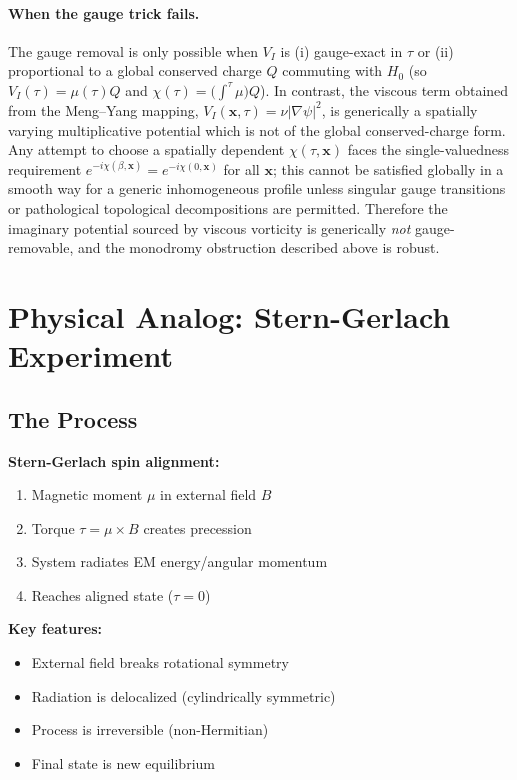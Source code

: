 \documentclass[11pt]{article}
\begin{document}
\paragraph{When the gauge trick fails.}
The gauge removal is only possible when \(V_I\) is (i) gauge-exact in \(\tau\) or (ii) proportional to a global conserved charge \(Q\) commuting with \(H_0\) (so \(V_I(\tau)=\mu(\tau)Q\) and \(\chi(\tau)=\big(\int^\tau \mu\big)Q\)). In contrast, the viscous term obtained from the Meng--Yang mapping, \(V_I(\mathbf x,\tau)=\nu|\nabla\psi|^2\), is generically a spatially varying multiplicative potential which is not of the global conserved-charge form. Any attempt to choose a spatially dependent \(\chi(\tau,\mathbf x)\) faces the single-valuedness requirement \(e^{-i\chi(\beta,\mathbf x)}=e^{-i\chi(0,\mathbf x)}\) for all \(\mathbf x\); this cannot be satisfied globally in a smooth way for a generic inhomogeneous profile unless singular gauge transitions or pathological topological decompositions are permitted. Therefore the imaginary potential sourced by viscous vorticity is generically \emph{not} gauge-removable, and the monodromy obstruction described above is robust.


\section{Physical Analog: Stern-Gerlach Experiment}

\subsection{The Process}

\textbf{Stern-Gerlach spin alignment:}
\begin{enumerate}
\item Magnetic moment $\mu$ in external field $B$
\item Torque $\tau = \mu \times B$ creates precession
\item System radiates EM energy/angular momentum
\item Reaches aligned state ($\tau = 0$)
\end{enumerate}

\textbf{Key features:}
\begin{itemize}
\item External field breaks rotational symmetry
\item Radiation is delocalized (cylindrically symmetric)
\item Process is irreversible (non-Hermitian)
\item Final state is new equilibrium
\end{itemize}
\end{document}
